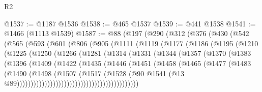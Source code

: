 \begin{lexlean}{R2}
\begin{coremodule}
@1537 := @1187 @1536
@1538 := @465 @1537
@1539 := @441 @1538
@1541 := @1466 (@1113 @1539)
@1587 := @88
    (@197
      (@290
        (@312
          (@376
            (@430
              (@542
                (@565
                  (@593
                    (@601
                      (@806
                        (@905
                          (@1111
                            (@1119
                              (@1177
                                (@1186
                                  (@1195
                                    (@1210
                                      (@1225
                                        (@1250
                                          (@1266
                                            (@1281
                                              (@1314
                                                (@1331
                                                  (@1344
                                                    (@1357
                                                      (@1370
                                                        (@1383
                                                          (@1396
                                                            (@1409
                                                              (@1422
                                                                (@1435
                                                                  (@1446
                                                                    (@1451
                                                                      (@1458
                                                                        (@1465
                                                                          (@1477
                                                                            (@1483
                                                                              (@1490
                                                                                (@1498
                                                                                  (@1507
                                                                                    (@1517
                                                                                      (@1528
                                                                                        (@90
                                                                                          @1541
                                                                                          (@13
                                                                                            @89))))))))))))))))))))))))))))))))))))))))))))

\end{coremodule}
\end{lexlean}
